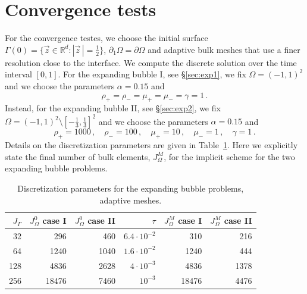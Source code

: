 \documentclass[a4paper,12pt,onecolumn]{article}
\newcommand{\R}{\mathbb R}
\begin{document}
\section{Convergence tests}\label{sec:ns_convergence_results}
For the convergence testes, we choose the initial surface $\Gamma(0) = \{ \vec
z \in \R^d : |\vec z\,| = \frac12 \}$, $\partial_1\Omega=\partial\Omega$ and
adaptive bulk meshes that use a finer resolution close to the interface. We
compute the discrete solution over the time interval $[0,1]$. For the expanding
bubble I, see \S\ref{sec:exp1}, we fix $\Omega = (-1,1)^2$ and we choose the
parameters $\alpha =0.15$ and
\begin{equation}
\rho_+ = \rho_- = \mu_+ = \mu_- = \gamma = 1\,.
\end{equation}
Instead, for the expanding bubble II, see \S\ref{sec:exp2}, we fix
$\Omega = (-1,1)^2 \setminus[-\frac13,\frac13]^2$ and we choose the parameters
$\alpha=0.15$ and
\begin{equation}
\rho_+ = 1000\,,\quad \rho_- = 100\,,\quad \mu_+ = 10\,,\quad \mu_- = 1\,,\quad
\gamma = 1\,.
\end{equation}
Details on the discretization parameters are given in
Table~\ref{tab:nsexpandingbubbleelements}. Here we explicitly state the final
number of bulk elements, $J_\Omega^M$, for the implicit scheme for the two
expanding bubble problems.
\begin{table}
\center
\begin{tabular}{rrrrrr}
\hline
$J_\Gamma$ & $J_\Omega^0$ case I & $J_\Omega^0$ case II & $\tau$ &
$J_\Omega^M$ case I & $J_\Omega^M$ case II\\
\hline
 32 &   296 &  460 & $6.4\cdot10^{-2}$ &   310 &  216 \\
 64 &  1240 & 1040 & $1.6\cdot10^{-2}$ &  1240 &  444 \\
128 &  4836 & 2628 &   $4\cdot10^{-3}$ &  4836 & 1378 \\
256 & 18476 & 7460 &         $10^{-3}$ & 18476 & 4476 \\
\hline
\end{tabular}
\caption[Navier--Stokes expanding bubble meshes parameters]
{Discretization parameters for the expanding bubble problems, adaptive meshes.}
\label{tab:nsexpandingbubbleelements}
\end{table}
\end{document}
